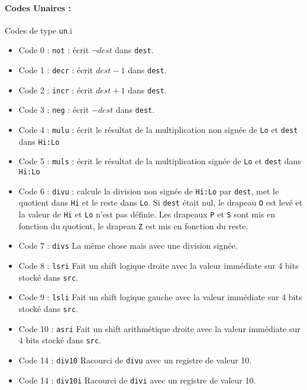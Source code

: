 \documentclass[12pt]{article}
\begin{document}
\paragraph{Codes Unaires :} Codes de type \verb!un!.i
\begin{itemize}
\item Code 0 : \verb!not! : écrit $\neg dest$ dans \verb!dest!.
\item Code 1 : \verb!decr! : écrit $dest-1$ dans \verb!dest!.
\item Code 2 : \verb!incr! : écrit $dest +1$ dans \verb!dest!.
\item Code 3 : \verb!neg! : écrit $ - dest$ dans \verb!dest!.
\item Code 4 : \verb!mulu! : écrit le résultat de la multiplication non signée de
  \verb!Lo! et \verb!dest! dans \verb!Hi:Lo! 
\item Code 5 : \verb!muls! : écrit le résultat de la multiplication signée de
  \verb!Lo! et \verb!dest! dans \verb!Hi:Lo! 
\item Code 6 : \verb!divu! : calcule la division non signée de \verb!Hi:Lo! par
  \verb!dest!, met le quotient dans \verb!Hi! et le reste dans \verb!Lo!. Si
  \verb!dest! était nul, le drapeau \verb!O! est levé et la valeur de
  \verb!Hi! et \verb!Lo! n'est pas définie.
  Les drapeaux \verb!P! et \verb!S! sont mis en fonction du quotient, le
  drapeau \verb!Z! est mis en fonction du reste.
\item Code 7 : \verb!divs! La même chose mais avec une division signée.
\item Code 8 : \verb!lsri! Fait un shift logique droite avec la valeur immédiate
  sur 4 bits stocké dans \verb!src!.
\item Code 9 : \verb!lsli! Fait un shift logique gauche avec la valeur immédiate
  sur 4 bits stocké dans \verb!src!.
\item Code 10 : \verb!asri! Fait un shift arithmétique droite avec la valeur immédiate
  sur 4 bits stocké dans \verb!src!.
\item Code 14 : \verb!div10! Racourci de \verb!divu! avec un registre de valeur 10.
\item Code 14 : \verb!div10i! Racourci de \verb!divi! avec un registre de valeur 10.
\end{itemize}
\end{document}
